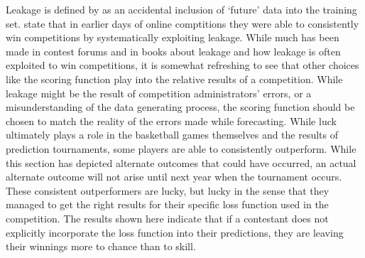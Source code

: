Leakage is defined by \cite{schutt2013doing} as an accidental inclusion of `future' data into the training set. \cite{schutt2013doing} state that in earlier days of online comptitions they were able to consistently win competitions by systematically exploiting leakage. While much has been made in contest forums and in books  about leakage and how leakage is often exploited to win competitions, it is somewhat refreshing to see that other choices like the scoring function play into the relative results of a competition. While leakage might be the result of competition administrators' errors, or a misunderstanding of the data generating process, the scoring function should be chosen to match the reality of the errors made while forecasting. While luck ultimately plays a role in the basketball games themselves and the results of prediction tournaments, some players are able to consistently outperform. While this section has depicted alternate outcomes that could have occurred, an actual alternate outcome will not arise until next year when the tournament occurs.  These consistent outperformers are lucky, but lucky in the sense that they managed to get the right results for their specific loss function used in the competition. The results shown here indicate that if a contestant does not explicitly incorporate the loss function into their predictions, they are leaving their winnings more to chance than to skill. 